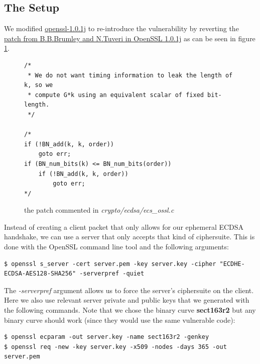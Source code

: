 \documentclass[a4paper,11pt]{article}
\begin{document}
\subsection{The Setup}

We modified \href{ftp://ftp.openssl.org/source/old/1.0.1/openssl-1.0.1j.tar.gz}{openssl-1.0.1j} to re-introduce the vulnerability by reverting the \href{https://git.openssl.org/?p=openssl.git;a=blobdiff;f=CHANGES;h=1633d27975c91f122c4e9266b2c3cf4e56e8ffbf;hp=22749650b701d91cc43af24a226369116c2a46f8;hb=992bdde62d2eea57bb85935a0c1a0ef0ca59b3da;hpb=bbcf3a9b300bc8109bb306a53f6f3445ba02e8e9}{patch from B.B.Brumley and N.Tuveri in OpenSSL 1.0.1j} as can be seen in figure \ref{fig:commented_patch}.

\begin{figure}[H]
\begin{verbatim}
/*
 * We do not want timing information to leak the length of k, so we
 * compute G*k using an equivalent scalar of fixed bit-length.
 */

/*
if (!BN_add(k, k, order))
    goto err;
if (BN_num_bits(k) <= BN_num_bits(order))
    if (!BN_add(k, k, order))
        goto err;
*/
\end{verbatim}
\caption{the patch commented in \textit{crypto/ecdsa/ecs\_ossl.c}}
\label{fig:commented_patch}
\end{figure}
Instead of creating a client packet that only allows for our ephemeral ECDSA handshake, we can use a server that only accepts that kind of ciphersuite. This is done with the OpenSSL command line tool and the following arguments:

\begin{verbatim}
$ openssl s_server -cert server.pem -key server.key -cipher "ECDHE-ECDSA-AES128-SHA256" -serverpref -quiet
\end{verbatim}

The \textit{-serverpref} argument allows us to force the server's ciphersuite on the client. Here we also use relevant server private and public keys that we generated with the following commands. Note that we chose the binary curve \textbf{sect163r2} but any binary curve should work (since they would use the same vulnerable code):

\begin{verbatim}
$ openssl ecparam -out server.key -name sect163r2 -genkey
$ openssl req -new -key server.key -x509 -nodes -days 365 -out server.pem
\end{verbatim}
\end{document}
